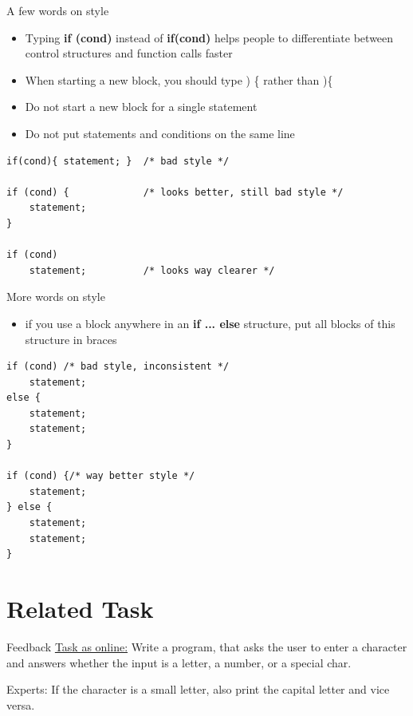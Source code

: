 \begin{frame}[fragile]{A few words on style}

	\begin{itemize}
		\item Typing \textbf{if (cond)} instead of \textbf{if(cond)} helps people to differentiate between control structures and function calls faster
		\item When starting a new block, you should type ) \{ rather than )\{
		\item Do not start a new block for a single statement
		\item Do not put statements and conditions on the same line
	\end{itemize}
	\begin{lstlisting}[numbers=none]
if(cond){ statement; }  /* bad style */

if (cond) {             /* looks better, still bad style */
    statement;
}

if (cond)
    statement;          /* looks way clearer */
\end{lstlisting}
\end{frame}

\begin{frame}[fragile]{More words on style}
	\begin{itemize}
		\item if you use a block anywhere in an \textbf{if ... else} structure, put all blocks of this structure in braces
	\end{itemize}
	\begin{lstlisting}[numbers=none]
if (cond) /* bad style, inconsistent */
    statement;
else {
    statement;
    statement;
}

if (cond) {/* way better style */
    statement;
} else {
    statement;
    statement;
}
\end{lstlisting}
\end{frame}
\section{Related Task}

\begin{frame}{Feedback}
\href{http://fsr.github.io/c-lessons/exercises/06_feedback.html}{Task as online:} \newline
Write a program, that asks the user to enter a character and answers whether the input
is a letter, a number, or a special char. \newline

Experts: If the character is a small letter, also print the capital letter and vice versa.

\end{frame}


